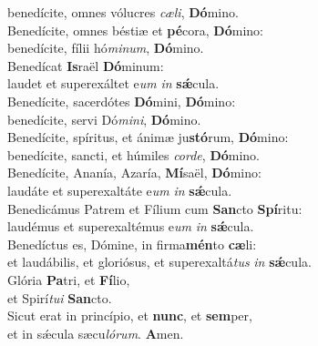 \oddverse benedícite, omnes vólucres \textit{cæ}\textit{li}, \textbf{Dó}mino.\\
\evenverse Benedícite, omnes béstiæ et \textbf{pé}cora, \textbf{Dó}mino:~\*\\
\evenverse benedícite, fílii hó\textit{mi}\textit{num}, \textbf{Dó}mino.\\
\oddverse Benedícat \textbf{Is}raël \textbf{Dó}minum:~\*\\
\oddverse laudet et superexáltet e\textit{um} \textit{in} \textbf{sǽ}cula.\\
\evenverse Benedícite, sacerdótes \textbf{Dó}mini, \textbf{Dó}mino:~\*\\
\evenverse benedícite, servi Dó\textit{mi}\textit{ni}, \textbf{Dó}mino.\\
\oddverse Benedícite, spíritus, et ánimæ ju\textbf{stó}rum, \textbf{Dó}mino:~\*\\
\oddverse benedícite, sancti, et húmiles \textit{cor}\textit{de}, \textbf{Dó}mino.\\
\evenverse Benedícite, Ananía, Azaría, \textbf{Mí}saël, \textbf{Dó}mino:~\*\\
\evenverse laudáte et superexaltáte e\textit{um} \textit{in} \textbf{sǽ}cula.\\
\oddverse Benedicámus Patrem et Fílium cum \textbf{San}cto \textbf{Spí}ritu:~\*\\
\oddverse laudémus et superexaltémus e\textit{um} \textit{in} \textbf{sǽ}cula.\\
\evenverse Benedíctus es, Dómine, in firma\textbf{mén}to \textbf{cæ}li:~\*\\
\evenverse et laudábilis, et gloriósus, et superexaltá\textit{tus} \textit{in} \textbf{sǽ}cula.\\
\oddverse Glória \textbf{Pa}tri, et \textbf{Fí}lio,~\*\\
\oddverse et Spirí\textit{tu}\textit{i} \textbf{San}cto.\\
\evenverse Sicut erat in princípio, et \textbf{nunc}, et \textbf{sem}per,~\*\\
\evenverse et in sǽcula sæcu\textit{ló}\textit{rum}. \textbf{A}men.\\
